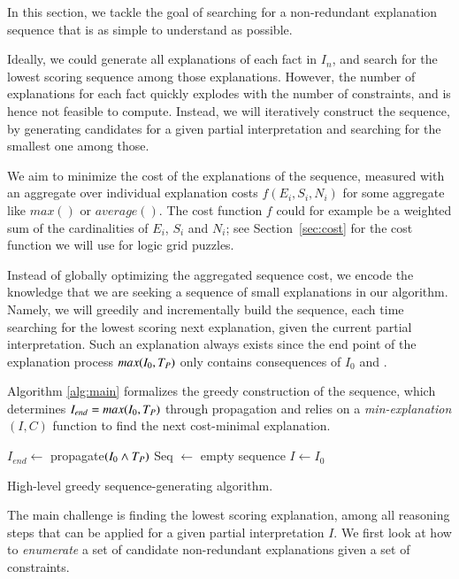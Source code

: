 In this section, we tackle the goal of searching for a non-redundant explanation sequence that is as simple to understand as possible. 

Ideally, we could generate all explanations of each fact in $I_n$, and search for the lowest scoring sequence among those explanations. However, the number of explanations for each fact quickly explodes with the number of constraints, and is hence not feasible to compute. Instead, we will iteratively construct the sequence, by generating candidates for a given partial interpretation and searching for the smallest one among those.

We aim to minimize the cost of the explanations of the sequence, measured with an aggregate over individual explanation costs $f(E_i, S_i, N_i)$ for some aggregate like $max()$ or $average()$. The cost function $f$ could for example be a weighted sum of the cardinalities of $E_i$, $S_i$ and $N_i$; see Section~\ref{sec:cost} for the cost function we will use for logic grid puzzles.

Instead of globally optimizing the aggregated sequence cost, we encode the knowledge that we are seeking a sequence of small explanations in our algorithm. Namely, we will greedily and incrementally build the sequence, each time searching for the lowest scoring next explanation, given the current partial interpretation. Such an explanation always exists since the end point of the explanation process $max(I_0,T_P)$ only contains consequences of $I_0$ and \allconstraints. 

Algorithm \ref{alg:main} formalizes the greedy construction of the sequence, which determines $I_{end} = max(I_0,T_P)$  through propagation and relies on a \textit{min-explanation$(I,C)$} function to find the next cost-minimal explanation. 

\begin{algorithm}
$I_{end} \gets$ propagate$(I_0\land T_P)$\;
Seq $\gets$ empty sequence\;
$I \gets I_0$\;
\caption{High-level greedy sequence-generating algorithm.}
\label{alg:main}
\end{algorithm}
The main challenge is finding the lowest scoring explanation, among all reasoning steps that can be applied for a given partial interpretation $I$. We first look at how to \textit{enumerate} a set of candidate non-redundant explanations given a set of constraints.

